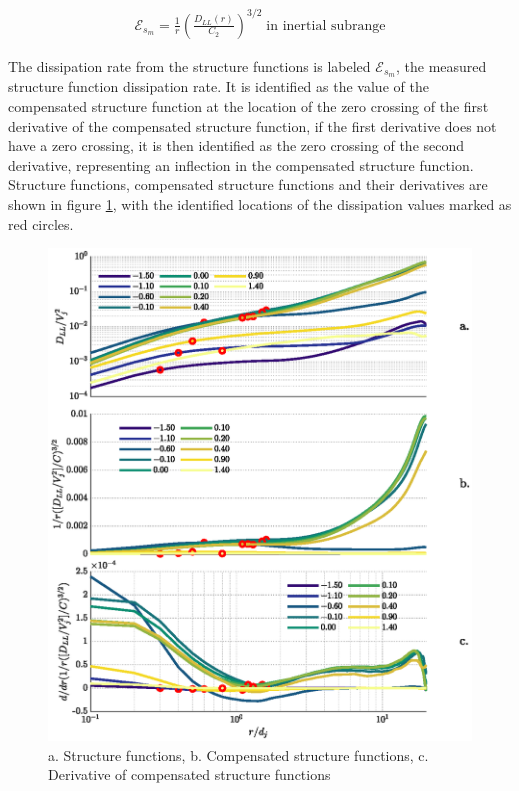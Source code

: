 \documentclass{article}
\newcommand\dsize[1]{\ensuremath{\mathcal{\scriptstyle {#1} } }} %
\newcommand{\diss}{\dsize{E}}
\newenvironment{myeq}   %
    {\begin{equation}
    \begin{gathered}
    }
    {
    \end{gathered}
    \end{equation}
    }
\begin{document}
\begin{myeq}
    \diss_{s_m} = \frac{1}{r}\left( \frac{D_{LL}(r)}{C_2} \right)^{3/2} \; \text{in inertial subrange}
    \label{CompStruct}
\end{myeq}

The dissipation rate from the structure functions is labeled $\diss_{s_m}$, the measured structure function dissipation rate. It is identified as the value of the compensated structure function at the location of the zero crossing of the first derivative of the compensated structure function, if the first derivative does not have a zero crossing, it is then identified as the zero crossing of the second derivative, representing an inflection in the compensated structure function. Structure functions, compensated structure functions and their derivatives are shown in figure \ref{StrucFun}, with the identified locations of the dissipation values marked as red circles.   

\begin{figure}[t]
    \centering
    \includegraphics[scale = 0.75]{figs/PG_4Hz_StructureFuns.eps}
    \caption{a. Structure functions, b. Compensated structure functions, c. Derivative of compensated structure functions}
    \label{StrucFun}
\end{figure}
\end{document}
